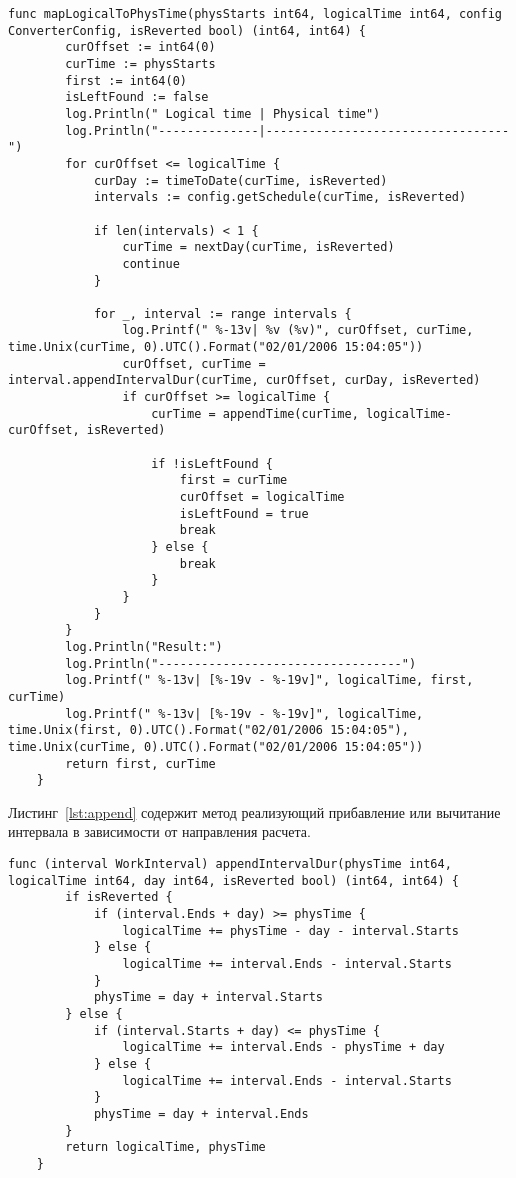 \begin{lstlisting}[language=Golang,caption={Алгоритм отображения},label=lst:map]
	func mapLogicalToPhysTime(physStarts int64, logicalTime int64, config ConverterConfig, isReverted bool) (int64, int64) {
		curOffset := int64(0)
		curTime := physStarts
		first := int64(0)
		isLeftFound := false
		log.Println(" Logical time | Physical time")
		log.Println("--------------|----------------------------------")
		for curOffset <= logicalTime {
			curDay := timeToDate(curTime, isReverted)
			intervals := config.getSchedule(curTime, isReverted)
	
			if len(intervals) < 1 {
				curTime = nextDay(curTime, isReverted)
				continue
			}
	
			for _, interval := range intervals {
				log.Printf(" %-13v| %v (%v)", curOffset, curTime, time.Unix(curTime, 0).UTC().Format("02/01/2006 15:04:05"))
				curOffset, curTime = interval.appendIntervalDur(curTime, curOffset, curDay, isReverted)
				if curOffset >= logicalTime {
					curTime = appendTime(curTime, logicalTime-curOffset, isReverted)
					
					if !isLeftFound {
						first = curTime
						curOffset = logicalTime
						isLeftFound = true
						break
					} else {
						break
					}
				}
			}
		}
		log.Println("Result:")
		log.Println("----------------------------------")
		log.Printf(" %-13v| [%-19v - %-19v]", logicalTime, first, curTime)
		log.Printf(" %-13v| [%-19v - %-19v]", logicalTime, time.Unix(first, 0).UTC().Format("02/01/2006 15:04:05"), time.Unix(curTime, 0).UTC().Format("02/01/2006 15:04:05"))
		return first, curTime
	}
\end{lstlisting}

Листинг~\ref{lst:append} содержит метод реализующий прибавление или вычитание интервала в зависимости от направления расчета.

\begin{lstlisting}[language=Golang,caption={Добавление рабочего интервала},label=lst:append]
	func (interval WorkInterval) appendIntervalDur(physTime int64, logicalTime int64, day int64, isReverted bool) (int64, int64) {
		if isReverted {
			if (interval.Ends + day) >= physTime {
				logicalTime += physTime - day - interval.Starts
			} else {
				logicalTime += interval.Ends - interval.Starts
			}
			physTime = day + interval.Starts
		} else {
			if (interval.Starts + day) <= physTime {
				logicalTime += interval.Ends - physTime + day
			} else {
				logicalTime += interval.Ends - interval.Starts
			}
			physTime = day + interval.Ends
		}
		return logicalTime, physTime
	}
\end{lstlisting}

